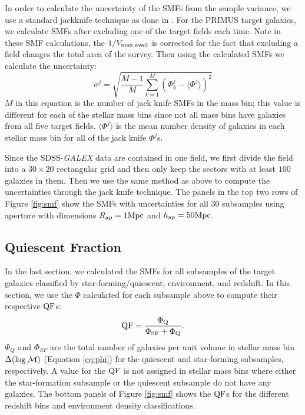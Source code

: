 \documentclass{emulateapj}
\begin{document}
In order to calculate the uncertainty of the SMFs from the sample variance, we use a standard jackknife technique as done in \cite{Moustakas:2013aa}.
For the PRIMUS target galaxies, we calculate SMFs after excluding one of the target fields each time.
Note in these SMF calculations, the $1/V_{\rm{max},\rm{avail}}$ is corrected for the fact that excluding a field changes the total area of the survey.
Then using the calculated SMFs we calculate the uncertainty: 
\begin{equation}
\sigma^j = \sqrt{\frac{M-1}{M} \sum\limits_{k=1}^{M} (\Phi^j_k - \langle \Phi^j \rangle)^2}
\end{equation} 
$M$ in this equation is the number of jack knife SMFs in the mass bin; this value is different for each of the stellar mass bins since not all mass bins have galaxies from all five target fields.
$\langle \Phi^j \rangle$ is the mean number density of galaxies in each stellar mass bin for all of the jack knife $\Phi^j$s.

Since the SDSS-{\em GALEX} data are contained in one field, we first divide the field into a $30 \times 20$ rectangular grid and then only keep the sectors with at least $100$ galaxies in them. 
Then we use the same method as above to compute the uncertainties through the jack knife technique. 
The panels in the top two rows of Figure \ref{fig:smf} show the SMFs with uncertainties for all $30$ subsamples using aperture with dimensions $R_{\rm{ap}} = 1 \rm{Mpc}$ and $h_{\rm{ap}} = 50 \rm{Mpc}$.  


\subsection{Quiescent Fraction} \label{sec:qf_const}
In the last section, we calculated the SMFs for all subsamples of the target galaxies classified by star-forming/quiescent, environment, and redshift. 
In this section, we use the $\Phi$ calculated for each subsample above to compute their respective $\rm{QF}$s: 
\begin{equation}
\rm{QF} = \frac{\Phi_{Q}}{\Phi_{SF}+\Phi_{Q}}.
\end{equation}
$\Phi_{Q}$ and $\Phi_{SF}$ are the total number of galaxies per unit volume in stellar mass bin $\Delta(\rm{log} \: \mathcal{M})$ (Equation \ref{eq:phi}) for the quiescent and star-forming subsamples, respectively.
A value for the $\rm{QF}$ is not assigned in stellar mass bins where either the star-formation subsample or the quiescent subsample do not have any galaxies. 
The bottom panels of Figure \ref{fig:smf} shows the $\rm{QF}$s for the different redshift bins and environment density classifications.
\end{document}
